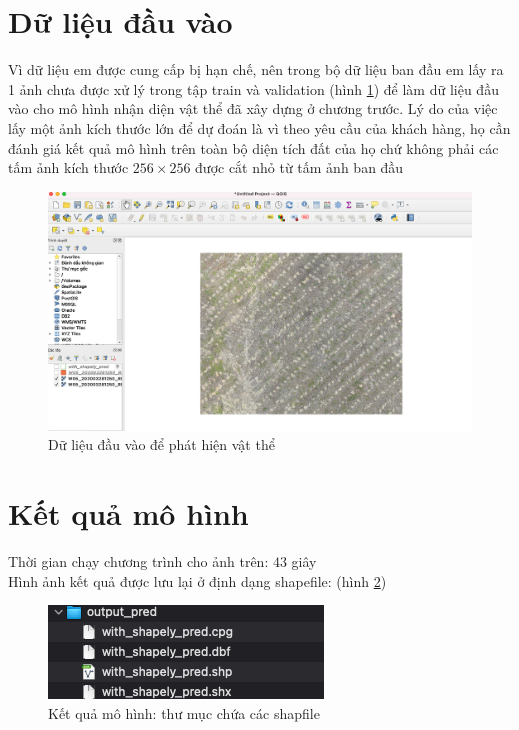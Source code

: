 \documentclass[a4paper, 12pt]{report}
\begin{document}
\section{Dữ liệu đầu vào}
Vì dữ liệu em được cung cấp bị hạn chế, nên trong bộ dữ liệu ban đầu em lấy ra 1 ảnh chưa được xử lý trong tập train và validation (hình \ref{fig:demo}) để làm dữ liệu đầu vào cho mô hình nhận diện vật thể đã xây dựng ở chương trước.  Lý do của việc lấy một ảnh kích thước lớn để dự đoán là vì theo yêu cầu của khách hàng,  họ cần đánh giá kết quả mô hình trên toàn bộ diện tích đất của họ chứ không phải các tấm ảnh kích thước $256 \times 256$ được cắt nhỏ từ tấm ảnh ban đầu
 \begin{figure}[!h]
	\centering
	\includegraphics[width=1\linewidth]{Images/demo}
	\caption{Dữ liệu đầu vào để phát hiện vật thể}
	\label{fig:demo}
\end{figure}

\section{Kết quả mô hình}
Thời gian chạy chương trình cho ảnh trên: $43$ giây \\
Hình ảnh kết quả được lưu lại ở định dạng shapefile: 	(hình \ref{fig:shpfile_demo_result})
 \begin{figure}[!h]
	\centering
	\includegraphics[width=0.5\linewidth]{Images/shpfile_demo_result}
	\caption{Kết quả mô hình: thư mục chứa các shapfile}
	\label{fig:shpfile_demo_result}
\end{figure}
\end{document}

